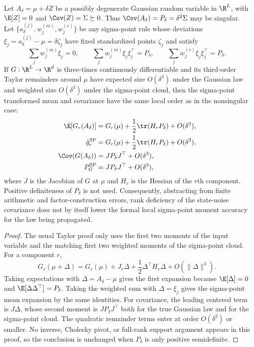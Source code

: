 \begin{proposition}
\label{prop:bf-degenerate-covariance-formal-ut-accuracy}
Let $A_\delta=\mu+\delta Z$ be a possibly degenerate Gaussian random
variable in $\R^L$, with $\E[Z]=0$ and
$\Cov(Z)=\Sigma\succeq0$.  Thus
$\Cov(A_\delta)=P_\delta=\delta^2\Sigma$ may be singular.  Let
$\{a_\delta^{(j)},w_j^{(m)},w_j^{(c)}\}$ be any sigma-point rule whose
deviations $\xi_j=a_\delta^{(j)}-\mu=\delta\zeta_j$ have fixed standardized
points $\zeta_j$ and satisfy
\[
  \sum_j w_j^{(m)}\xi_j=0,\qquad
  \sum_j w_j^{(m)}\xi_j\xi_j^\top=P_\delta,\qquad
  \sum_j w_j^{(c)}\xi_j\xi_j^\top=P_\delta .
\]
If $G:\R^L\to\R^d$ is three-times continuously differentiable and its
third-order Taylor remainders around $\mu$ have expected size $O(\delta^3)$
under the Gaussian law and weighted size $O(\delta^3)$ under the sigma-point
cloud, then the sigma-point transformed mean and covariance have the same local
order as in the nonsingular case:
\begin{align}
  \E[G_r(A_\delta)]
    &=
    G_r(\mu)+\frac{1}{2}\tr(H_rP_\delta)+O(\delta^3),\\
  \hat g_r^{\mathrm{SP}}
    &=
    G_r(\mu)+\frac{1}{2}\tr(H_rP_\delta)+O(\delta^3),\\
  \Cov(G(A_\delta))
    &=
    JP_\delta J^\top+O(\delta^3),\\
  P_G^{\mathrm{SP}}
    &=
    JP_\delta J^\top+O(\delta^3),
\end{align}
where $J$ is the Jacobian of $G$ at $\mu$ and $H_r$ is the Hessian of
the $r$th component.  Positive definiteness of $P_\delta$ is not used.
Consequently, abstracting from finite arithmetic and factor-construction
errors, rank deficiency of the state-noise covariance does not by itself lower
the formal local sigma-point moment accuracy for the law being propagated.
\end{proposition}

\begin{proof}
The usual Taylor proof only uses the first two moments of the input variable
and the matching first two weighted moments of the sigma-point cloud.  For a
component $r$,
\begin{equation}
  G_r(\mu+\Delta)
  =
  G_r(\mu)+J_r\Delta+\frac{1}{2}\Delta^\top H_r\Delta
  +O(\|\Delta\|^3).
\end{equation}
Taking expectations with $\Delta=A_\delta-\mu$ gives the first expansion
because $\E[\Delta]=0$ and $\E[\Delta\Delta^\top]=P_\delta$.  Taking the
weighted sum with $\Delta=\xi_j$ gives the sigma-point mean expansion by the
same identities.  For covariance, the leading centered term is
$J\Delta$, whose second moment is $JP_\delta J^\top$ both for the true
Gaussian law and for the sigma-point cloud.  The quadratic remainder terms
enter at order $O(\delta^3)$ or smaller.  No inverse, Cholesky pivot, or
full-rank support argument appears in this proof, so the conclusion is
unchanged when $P_\delta$ is only positive semidefinite.
\end{proof}

